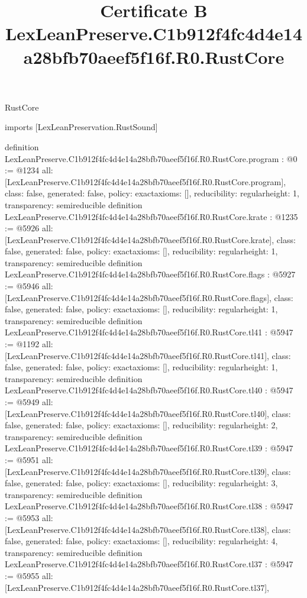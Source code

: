 \begin{lexlean}{RustCore}
\title{Certificate B LexLeanPreserve.C1b912f4fc4d4e14a28bfb70aeef5f16f.R0.RustCore}
\begin{coremodule}
imports [LexLeanPreservation.RustSound]

definition LexLeanPreserve.C1b912f4fc4d4e14a28bfb70aeef5f16f.R0.RustCore.program : @0 := @1234 {
  all: [LexLeanPreserve.C1b912f4fc4d4e14a28bfb70aeef5f16f.R0.RustCore.program],
  class: false,
  generated: false,
  policy: exact{axioms: []},
  reducibility: regular{height: 1},
  transparency: semireducible
}
definition LexLeanPreserve.C1b912f4fc4d4e14a28bfb70aeef5f16f.R0.RustCore.krate : @1235 := @5926 {
  all: [LexLeanPreserve.C1b912f4fc4d4e14a28bfb70aeef5f16f.R0.RustCore.krate],
  class: false,
  generated: false,
  policy: exact{axioms: []},
  reducibility: regular{height: 1},
  transparency: semireducible
}
definition LexLeanPreserve.C1b912f4fc4d4e14a28bfb70aeef5f16f.R0.RustCore.flags : @5927 := @5946 {
  all: [LexLeanPreserve.C1b912f4fc4d4e14a28bfb70aeef5f16f.R0.RustCore.flags],
  class: false,
  generated: false,
  policy: exact{axioms: []},
  reducibility: regular{height: 1},
  transparency: semireducible
}
definition LexLeanPreserve.C1b912f4fc4d4e14a28bfb70aeef5f16f.R0.RustCore.tl41 : @5947 := @1192 {
  all: [LexLeanPreserve.C1b912f4fc4d4e14a28bfb70aeef5f16f.R0.RustCore.tl41],
  class: false,
  generated: false,
  policy: exact{axioms: []},
  reducibility: regular{height: 1},
  transparency: semireducible
}
definition LexLeanPreserve.C1b912f4fc4d4e14a28bfb70aeef5f16f.R0.RustCore.tl40 : @5947 := @5949 {
  all: [LexLeanPreserve.C1b912f4fc4d4e14a28bfb70aeef5f16f.R0.RustCore.tl40],
  class: false,
  generated: false,
  policy: exact{axioms: []},
  reducibility: regular{height: 2},
  transparency: semireducible
}
definition LexLeanPreserve.C1b912f4fc4d4e14a28bfb70aeef5f16f.R0.RustCore.tl39 : @5947 := @5951 {
  all: [LexLeanPreserve.C1b912f4fc4d4e14a28bfb70aeef5f16f.R0.RustCore.tl39],
  class: false,
  generated: false,
  policy: exact{axioms: []},
  reducibility: regular{height: 3},
  transparency: semireducible
}
definition LexLeanPreserve.C1b912f4fc4d4e14a28bfb70aeef5f16f.R0.RustCore.tl38 : @5947 := @5953 {
  all: [LexLeanPreserve.C1b912f4fc4d4e14a28bfb70aeef5f16f.R0.RustCore.tl38],
  class: false,
  generated: false,
  policy: exact{axioms: []},
  reducibility: regular{height: 4},
  transparency: semireducible
}
definition LexLeanPreserve.C1b912f4fc4d4e14a28bfb70aeef5f16f.R0.RustCore.tl37 : @5947 := @5955 {
  all: [LexLeanPreserve.C1b912f4fc4d4e14a28bfb70aeef5f16f.R0.RustCore.tl37],
}
\end{coremodule}
\end{lexlean}
